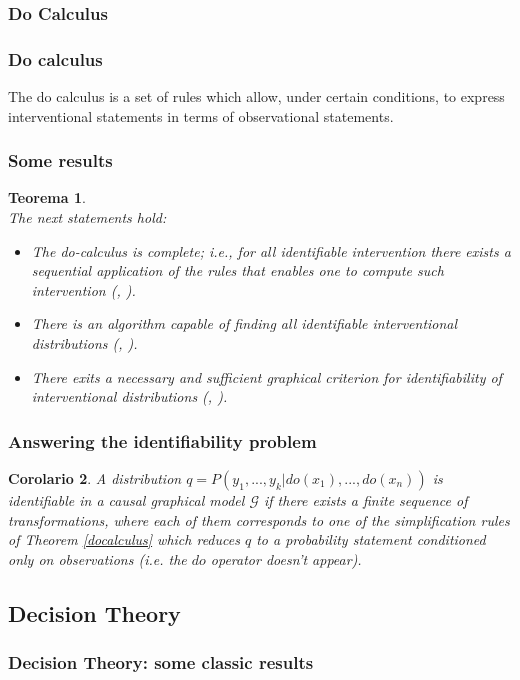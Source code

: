 \documentclass{beamer}
\theoremstyle{plain}
\newtheorem{teo}{Teorema}
\newtheorem{cor}[teo]{Corolario}
\begin{document}
		\subsubsection{Do Calculus}
		\begin{frame}[allowframebreaks]
		\frametitle{Do calculus}
		The do calculus is a set of rules which allow, under certain conditions, to express interventional statements in terms of observational statements.
		\end{frame}
		\begin{frame}
		\frametitle{Some results}
		\begin{teo}{\cite{peters2017elements}}\\
 		The next statements hold:
		\begin{itemize}
		\item The do-calculus is complete; i.e., for all identifiable intervention there exists a sequential application of the rules that enables one to compute such intervention (\cite{huang2006pearl}, 				\cite{shpitser2006identification}).
		\item There is an algorithm capable of finding all identifiable interventional distributions (\cite{tian2002}, \cite{huang2006pearl}).
		\item There exits a necessary and sufficient graphical criterion for identifiability of interventional distributions (\cite{shpitser2006identification}, \cite{huang2006pearl}).
		\end{itemize}
		\end{teo}
		\end{frame}
		\begin{frame}
		\frametitle{Answering the identifiability problem}
		\begin{cor} 
		A distribution $q=P(y_1,...,y_k | do(x_1),...,do(x_n))$ is identifiable in a causal graphical model $\mathcal{G}$ if there exists a finite sequence of transformations, where each of them corresponds to one of the simplification rules of Theorem \ref{docalculus} which reduces $q$ to a probability statement conditioned only on observations (i.e. the $do$ operator doesn't appear).
\end{cor}
		\end{frame}
	\subsection{Decision Theory}
	\begin{frame}
	\frametitle{Decision Theory: some classic results}
	\end{frame}
\end{document}
